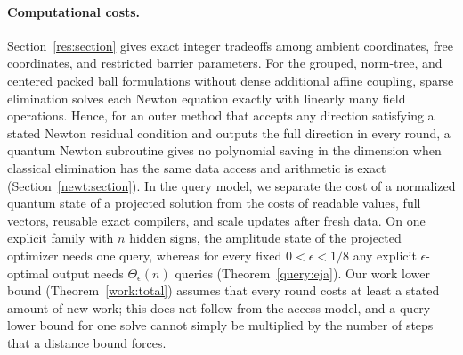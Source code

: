 \paragraph{Computational costs.}
Section~\ref{res:section} gives exact integer tradeoffs among ambient
coordinates, free coordinates, and restricted barrier parameters. For
the grouped, norm-tree, and centered packed ball formulations without
dense additional affine coupling, sparse elimination solves each Newton
equation exactly with linearly many field operations. Hence, for an
outer method that accepts any direction satisfying a stated Newton
residual condition and outputs the full direction in every round, a
quantum Newton subroutine gives no polynomial saving in the dimension
when classical elimination has the same data access and arithmetic is
exact (Section~\ref{newt:section}). In the query model, we separate the
cost of a normalized quantum state of a projected solution from the
costs of readable values, full vectors, reusable exact compilers, and
scale updates after fresh data. On one explicit family with $n$ hidden
signs, the amplitude state of the projected optimizer needs one query,
whereas for every fixed $0<\epsilon<1/8$ any explicit $\epsilon$-optimal
output needs $\Theta_\epsilon(n)$ queries (Theorem~\ref{query:eja}). Our
work lower bound (Theorem~\ref{work:total}) assumes that every round
costs at least a stated amount of new work; this does not follow from
the access model, and a query lower bound for one solve cannot simply be
multiplied by the number of steps that a distance bound forces.

